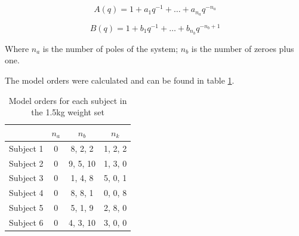 \documentclass[letterpaper, 10 pt, conference]{ieeeconf}  %
\begin{document}
\begin{equation}
\label{eq:A}
A(q) = 1 + a_1q^{-1}+\dots+a_{n_a}q^{-n_a}
\end{equation}

\begin{equation}
\label{eq:B}
B(q) = 1 + b_1q^{-1}+\dots+b_{n_b}q^{-n_b+1}
\end{equation}


Where \(n_a\) is the number of poles of the system; \(n_b\) is the number of zeroes plus one.

The model orders were calculated and can be found in table \ref{ta:order}.

\begin{table}[h]
\caption{Model orders for each subject in the 1.5kg weight set}
\label{ta:order}
\centering
\begin{tabular}{|c|c|c|c|}
\hline
 & \(n_a\) & \(n_b\) & \(n_k\)\\
\hline \hline
Subject 1 & 0 & 8, 2, 2 & 1, 2, 2\\
\hline
Subject 2 & 0 & 9, 5, 10 & 1, 3, 0\\
\hline
Subject 3 & 0 & 1, 4, 8 & 5, 0, 1\\
\hline
Subject 4 & 0 & 8, 8, 1 & 0, 0, 8\\
\hline
Subject 5 & 0 & 5, 1, 9 & 2, 8, 0\\
\hline
Subject 6 & 0 & 4, 3, 10 & 3, 0, 0\\
\hline
\end{tabular}
\end{table}
\end{document}
